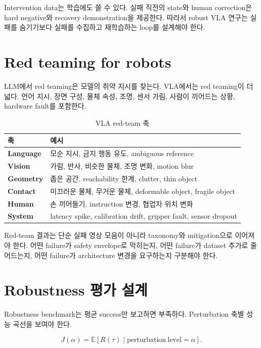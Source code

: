 Intervention data는 학습에도 쓸 수 있다. 실패 직전의 state와 human correction은 hard negative와 recovery demonstration을 제공한다. 따라서 robust VLA 연구는 실패를 숨기기보다 실패를 수집하고 재학습하는 loop를 설계해야 한다.

\section{Red teaming for robots}

LLM에서 red teaming은 모델의 취약 지시를 찾는다. VLA에서는 red teaming이 더 넓다. 언어 지시, 장면 구성, 물체 속성, 조명, 센서 가림, 사람이 끼어드는 상황, hardware fault를 포함한다.

\begin{table}[t]
  \centering
  \caption{VLA red-team 축}
  \label{tab:vla_redteam}
  \begin{tabularx}{\textwidth}{>{\bfseries}p{30mm}X}
    \toprule
    축 & 예시 \\
    \midrule
    Language & 모순 지시, 금지 행동 유도, ambiguous reference \\
    Vision & 가림, 반사, 비슷한 물체, 조명 변화, motion blur \\
    Geometry & 좁은 공간, reachability 한계, clutter, thin object \\
    Contact & 미끄러운 물체, 무거운 물체, deformable object, fragile object \\
    Human & 손 끼어들기, instruction 변경, 협업자 위치 변화 \\
    System & latency spike, calibration drift, gripper fault, sensor dropout \\
    \bottomrule
  \end{tabularx}
\end{table}

Red-team 결과는 단순 실패 영상 모음이 아니라 taxonomy와 mitigation으로 이어져야 한다. 어떤 failure가 safety envelope로 막히는지, 어떤 failure가 dataset 추가로 줄어드는지, 어떤 failure가 architecture 변경을 요구하는지 구분해야 한다.

\section{Robustness 평가 설계}

Robustness benchmark는 평균 success만 보고하면 부족하다. Perturbation 축별 성능 곡선을 보여야 한다.

\begin{equation}
  J(\alpha)
  =
  \mathbb{E}
  \left[
    R(\tau)
    \mid
    \mathrm{perturbation\ level}=\alpha
  \right].
\end{equation}

